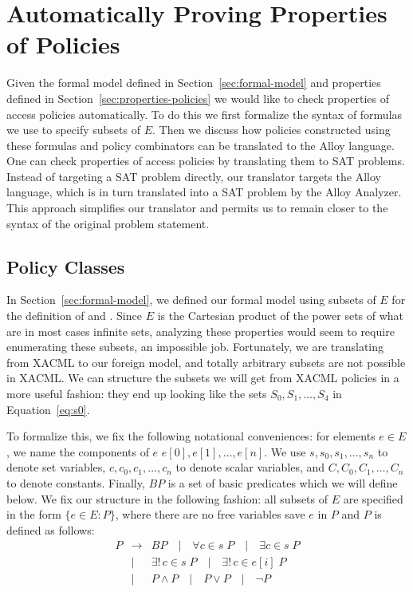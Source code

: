 \section{Automatically Proving Properties of Policies}
\label{sec:autom-prov-prop}

Given the formal model defined in Section~\ref{sec:formal-model} and
properties defined in Section~\ref{sec:properties-policies} we would
like to check properties of access policies automatically.  To do this
we first formalize the syntax of formulas we use to specify subsets of
$E$.  Then we discuss how policies constructed using these formulas
and policy combinators can be translated to the Alloy language.  One
can check properties of access policies by translating them to SAT
problems.  Instead of targeting a SAT problem directly, our translator
targets the Alloy language, which is in turn translated into a SAT
problem by the Alloy Analyzer.  This approach simplifies our
translator and permits us to remain closer to the syntax of the
original problem statement.

\subsection{Policy Classes}
\label{sec:policy-classes}

In Section~\ref{sec:formal-model}, we defined our formal model using
subsets of $E$ for the definition of \Scope and \Err.  Since $E$ is
the Cartesian product of the power sets of what are in most cases
infinite sets, analyzing these properties would seem to require
enumerating these subsets, an impossible job.  Fortunately, we are
translating from XACML to our foreign model, and totally arbitrary
subsets are not possible in XACML.  We can structure the subsets we
will get from XACML policies in a more useful fashion: they end up
looking like the sets $S_0, S_1, \dots, S_4$ in
Equation~\eqref{eq:s0}.

To formalize this, we fix the following notational conveniences: for
elements $e \in E$, we name the components of $e$ $e[0], e[1], \dots,
e[n]$.  We use $s, s_0, s_1, \dots, s_n$ to denote set variables, $c,
c_0, c_1, \dots, c_n$ to denote scalar variables, and $C, C_0, C_1,
\dots, C_n$ to denote constants.  Finally, $BP$ is a set of basic
predicates which we will define below.  We fix our structure in the
following fashion: all subsets of $E$ are specified in the form $\{ e
\in E : P \}$, where there are no free variables save $e$ in $P$ and
$P$ is defined as follows:
\begin{eqnarray*}
  P & \rightarrow & BP \quad | \quad \forall c \in s \; P \quad |
  \quad \exists c \in s \; P \\
  & | & \exists ! \, c \in s \; P \quad | \quad \exists ! \, c \in e[i] \; P \\
  & | & P \wedge P \quad | \quad P \vee P \quad | \quad \neg P
\end{eqnarray*}

